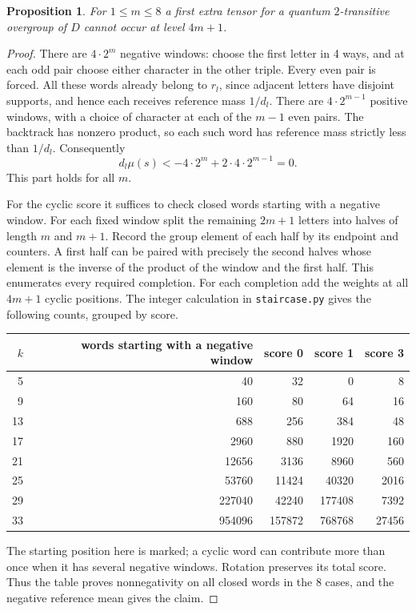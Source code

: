 \documentclass[11pt,a4paper]{amsart}
\newtheorem{proposition}[theorem]{Proposition}
\begin{document}
\begin{proposition}\label{prop:stair}
For $1\leq m\leq8$ a first extra tensor for a quantum $2$-transitive overgroup of $D$ cannot occur at level $4m+1$.
\end{proposition}
\begin{proof}
There are $4\cdot2^m$ negative windows: choose the first letter in 4 ways, and at each odd pair choose either character in the other triple. Every even pair is forced. All these words already belong to $r_l$, since adjacent letters have disjoint supports, and hence each receives reference mass $1/d_l$. There are $4\cdot2^{m-1}$ positive windows, with a choice of character at each of the $m-1$ even pairs. The backtrack has nonzero product, so each such word has reference mass strictly less than $1/d_l$. Consequently
\[
 d_l\mu(s)<-4\cdot2^m+2\cdot4\cdot2^{m-1}=0 .
\]
This part holds for all $m$.

For the cyclic score it suffices to check closed words starting with a negative window. For each fixed window split the remaining $2m+1$ letters into halves of length $m$ and $m+1$. Record the group element of each half by its endpoint and counters. A first half can be paired with precisely the second halves whose element is the inverse of the product of the window and the first half. This enumerates every required completion. For each completion add the weights at all $4m+1$ cyclic positions. The integer calculation in \texttt{staircase.py} gives the following counts, grouped by score.
\begin{center}
\begin{tabular}{rr|rrr}
\toprule
$k$&words starting with a negative window&score 0&score 1&score 3\\ \midrule
 5&40&32&0&8\\
 9&160&80&64&16\\
13&688&256&384&48\\
17&2960&880&1920&160\\
21&12656&3136&8960&560\\
25&53760&11424&40320&2016\\
29&227040&42240&177408&7392\\
33&954096&157872&768768&27456\\ \bottomrule
\end{tabular}
\end{center}
The starting position here is marked; a cyclic word can contribute more than once when it has several negative windows. Rotation preserves its total score. Thus the table proves nonnegativity on all closed words in the 8 cases, and the negative reference mean gives the claim.
\end{proof}
\end{document}
